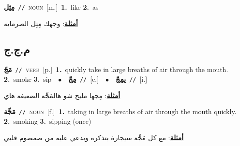 \documentclass[10pt,a4paper,twoside]{article} %
\begin{document}
\begin{multicols}{2}
{\setlength\topsep{0pt}\textbf{\foreignlanguage{arabic}{مِثِل}}\ {\color{gray}\texttt{//}\color{black}}\ \textsc{noun}\ [m.]\ \textbf{1.}~like  \textbf{2.}~as\  \begin{flushright}\color{gray}\foreignlanguage{arabic}{\textbf{\underline{\foreignlanguage{arabic}{أمثلة}}}: وجهك مِثِل الصرماية}\end{flushright}\color{black}} \vspace{2mm}

\vspace{-3mm}
\subsection*{\color{blue}\foreignlanguage{arabic}{م.ج.ج}\color{blue}{}} 

{\setlength\topsep{0pt}\textbf{\foreignlanguage{arabic}{مَجّ}}\ {\color{gray}\texttt{//}\color{black}}\ \textsc{verb}\ [p.]\ \textbf{1.}~quickly take in large breaths of air through the mouth.  \textbf{2.}~smoke  \textbf{3.}~sip\ \ $\bullet$\ \ \setlength\topsep{0pt}\textbf{\foreignlanguage{arabic}{مِجّ}}\ {\color{gray}\texttt{//}\color{black}}\ [c.]\ \ $\bullet$\ \ \setlength\topsep{0pt}\textbf{\foreignlanguage{arabic}{يمِجّ}}\ {\color{gray}\texttt{//}\color{black}}\ [i.]\  \begin{flushright}\color{gray}\foreignlanguage{arabic}{\textbf{\underline{\foreignlanguage{arabic}{أمثلة}}}: مِجها مليح شو هالمَجِّة الضعيفة هاي}\end{flushright}\color{black}} \vspace{2mm}

{\setlength\topsep{0pt}\textbf{\foreignlanguage{arabic}{مَجِّة}}\ {\color{gray}\texttt{//}\color{black}}\ \textsc{noun}\ [f.]\ \textbf{1.}~taking in large breaths of air through the mouth quickly.  \textbf{2.}~smoking  \textbf{3.}~sipping (once)\  \begin{flushright}\color{gray}\foreignlanguage{arabic}{\textbf{\underline{\foreignlanguage{arabic}{أمثلة}}}: مع كل مَجِّة سيجارة بتذكره وبدعي عليه من صمصوم قلبي}\end{flushright}\color{black}} \vspace{2mm}


\end{multicols}
\end{document}
